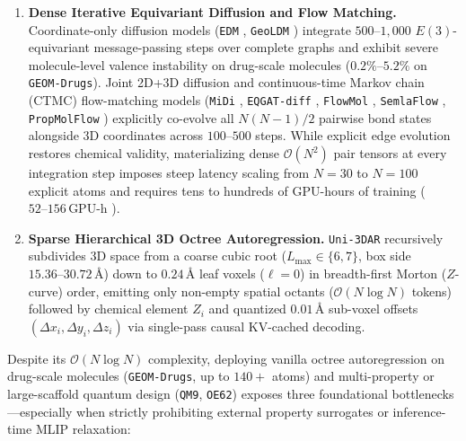 \documentclass[11pt,a4paper]{article}
\begin{document}
\begin{enumerate}[leftmargin=1.6em,itemsep=2pt,topsep=3pt]
    \item \textbf{Dense Iterative Equivariant Diffusion and Flow Matching.} Coordinate-only diffusion models (\texttt{EDM} \citep{hoogeboom2022edm}, \texttt{GeoLDM} \citep{xu2023geoldm}) integrate $500\text{--}1{,}000$ $E(3)$-equivariant message-passing steps over complete graphs and exhibit severe molecule-level valence instability on drug-scale molecules ($0.2\%\text{--}5.2\%$ on \texttt{GEOM-Drugs}). Joint 2D+3D diffusion and continuous-time Markov chain (CTMC) flow-matching models (\texttt{MiDi} \citep{vignac2023midi}, \texttt{EQGAT-diff} \citep{le2023eqgatdiff}, \texttt{FlowMol} \citep{dunn2024flowmol}, \texttt{SemlaFlow} \citep{irwin2025semlaflow}, \texttt{PropMolFlow} \citep{zeng2026propmolflow}) explicitly co-evolve all $N(N-1)/2$ pairwise bond states alongside 3D coordinates across $100\text{--}500$ steps. While explicit edge evolution restores chemical validity, materializing dense $\mathcal{O}(N^2)$ pair tensors at every integration step imposes steep latency scaling from $N=30$ to $N=100$ explicit atoms and requires tens to hundreds of GPU-hours of training ($52\text{--}156\,\text{GPU-h}$ \citep{zeng2026propmolflow}).
    \item \textbf{Sparse Hierarchical 3D Octree Autoregression.} \texttt{Uni-3DAR} \citep{lu2025uni3dar} recursively subdivides 3D space from a coarse cubic root ($L_{\max} \in \{6, 7\}$, box side $15.36\text{--}30.72\,\text{\AA}$) down to $0.24\,\text{\AA}$ leaf voxels ($\ell = 0$) in breadth-first Morton ($Z$-curve) order, emitting only non-empty spatial octants ($\mathcal{O}(N \log N)$ tokens) followed by chemical element $Z_i$ and quantized $0.01\,\text{\AA}$ sub-voxel offsets $(\Delta x_i, \Delta y_i, \Delta z_i)$ via single-pass causal KV-cached decoding.
\end{enumerate}

Despite its $\mathcal{O}(N \log N)$ complexity, deploying vanilla octree autoregression on drug-scale molecules (\texttt{GEOM-Drugs}, up to $140+$ atoms) and multi-property or large-scaffold quantum design (\texttt{QM9}, \texttt{OE62}) exposes three foundational bottlenecks---especially when strictly prohibiting external property surrogates or inference-time MLIP relaxation:
\end{document}
